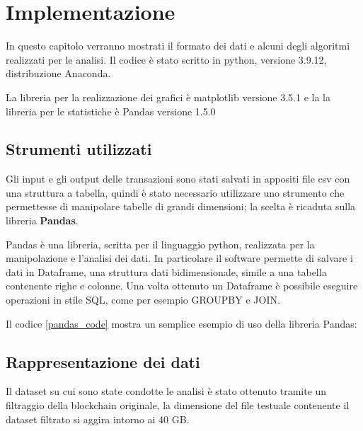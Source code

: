 \chapter{Implementazione}
\captionsetup[table]{name=Struttura}
In questo capitolo verranno mostrati il formato dei dati e alcuni degli algoritmi realizzati per le analisi.
Il codice è stato scritto in python, versione 3.9.12, distribuzione Anaconda.

La libreria per la realizzazione dei grafici è matplotlib versione 3.5.1 e la la libreria per le statistiche è Pandas versione 1.5.0
\section{Strumenti utilizzati}
Gli input e gli output delle transazioni sono stati salvati in appositi file csv con una struttura a tabella, quindi è stato necessario utilizzare uno strumento che permettesse di manipolare tabelle di grandi dimensioni; la scelta è ricaduta sulla libreria \textbf{Pandas}. 

Pandas \cite{pandas} è una libreria, scritta per il linguaggio python, realizzata per la manipolazione e l'analisi dei dati. In particolare il software permette di salvare i dati in Dataframe, una struttura dati bidimensionale, simile a una tabella contenente righe e colonne. Una volta ottenuto un Dataframe è possibile eseguire operazioni in stile SQL, come per esempio GROUPBY e JOIN. 

Il codice \ref{pandas_code} mostra un semplice esempio di uso della libreria Pandas:

\section{Rappresentazione dei dati}
Il dataset su cui sono state condotte le analisi è stato ottenuto tramite un filtraggio della blockchain originale, la dimensione del file testuale contenente il dataset filtrato si aggira intorno ai 40 GB.

